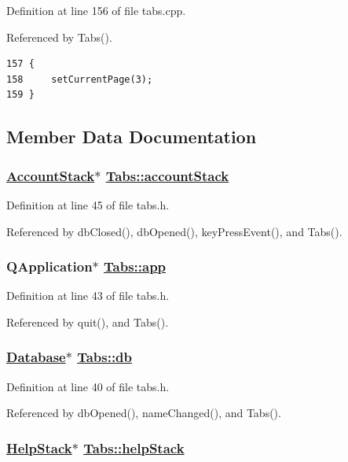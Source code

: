 Definition at line 156 of file tabs.cpp.

Referenced by Tabs().

\footnotesize\begin{verbatim}157 {
158     setCurrentPage(3);
159 }
\end{verbatim}\normalsize 




\subsection{Member Data Documentation}
\hypertarget{classTabs_r4}{
\subsubsection[accountStack]{\setlength{\rightskip}{0pt plus 5cm}\hyperlink{classAccountStack}{Account\-Stack}$\ast$ \hyperlink{classTabs_r4}{Tabs::account\-Stack}}}
\label{classTabs_r4}


Definition at line 45 of file tabs.h.

Referenced by db\-Closed(), db\-Opened(), key\-Press\-Event(), and Tabs().\hypertarget{classTabs_r2}{
\subsubsection[app]{\setlength{\rightskip}{0pt plus 5cm}QApplication$\ast$ \hyperlink{classTabs_r2}{Tabs::app}}}
\label{classTabs_r2}


Definition at line 43 of file tabs.h.

Referenced by quit(), and Tabs().\hypertarget{classTabs_r0}{
\subsubsection[db]{\setlength{\rightskip}{0pt plus 5cm}\hyperlink{classDatabase}{Database}$\ast$ \hyperlink{classTabs_r0}{Tabs::db}}}
\label{classTabs_r0}


Definition at line 40 of file tabs.h.

Referenced by db\-Opened(), name\-Changed(), and Tabs().\hypertarget{classTabs_r7}{
\subsubsection[helpStack]{\setlength{\rightskip}{0pt plus 5cm}\hyperlink{classHelpStack}{Help\-Stack}$\ast$ \hyperlink{classTabs_r7}{Tabs::help\-Stack}}}
\label{classTabs_r7}


